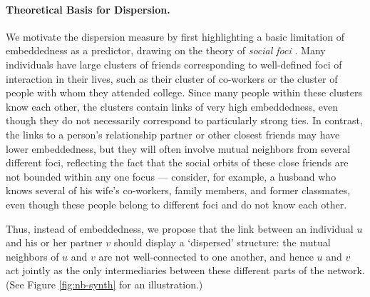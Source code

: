 \documentclass{sigchi}
\newcommand{\xhdr}[1]{\paragraph*{\bf #1.}}
\begin{document}
\xhdr{Theoretical Basis for Dispersion}
We motivate the dispersion measure by first highlighting a basic 
limitation of embeddedness as a predictor, drawing on the theory
of {\em social foci} \cite{feld-foci}.
Many individuals have large clusters of friends corresponding to well-defined 
foci of interaction in their lives, such as their cluster of
co-workers or the cluster of people with whom they attended college.
Since many people within these clusters know each other, the clusters
contain links of very high embeddedness, even though they do not 
necessarily correspond to particularly strong ties.
In contrast, the links to 
a person's relationship partner or other
closest friends may have lower embeddedness,
but they will often involve mutual neighbors from several
different foci, reflecting the fact that the social orbits 
of these close friends are not bounded within any one focus ---
consider, for example, a husband who knows several of his
wife's co-workers, family members, and former classmates, even though
these people belong to different foci and do not know each other.

Thus, instead of embeddedness, we propose that the link 
between an individual $u$ and his or her partner $v$ should display a
`dispersed' structure: the mutual neighbors of $u$ and $v$ are not
well-connected to one another, and hence $u$ and $v$ act jointly
as the only intermediaries 
between these different parts of the network.
(See Figure \ref{fig:nb-synth} for an illustration.)
\end{document}

